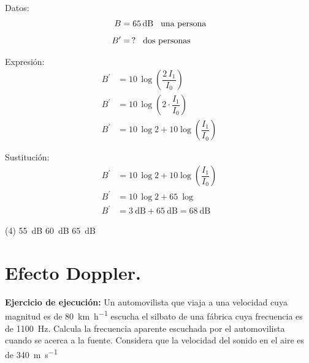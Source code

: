 \documentclass[12pt, letter]{exam}
\begin{document}
\begin{questions}
    \begin{minipage}[t]{0.35\linewidth}
    Datos: 
    \begin{align*}
    B &= \SI{65}{\dB} \hspace{0.3cm} \text{una persona} \\[0.5em]
    B^{\prime} &= \, ? \hspace{0.3cm} \text{dos personas}
    \end{align*}
    \end{minipage}
    \hspace{1cm}
    \begin{minipage}[t]{0.4\linewidth}
    Expresión:
    \begin{align*}
    B^{\prime} &= 10 \, \log \left( \dfrac{2 \, I_{1}}{I_{0}} \right) \\[0.4em]
    B^{\prime} &= 10 \, \log \left( 2 \cdot \dfrac{I_{1}}{I_{0}} \right) \\[0.4em]
    B^{\prime} &= 10 \, \log 2 + 10 \log \left( \dfrac{I_{1}}{I_{0}} \right)
    \end{align*}
    \end{minipage}

    Sustitución:
    \begin{align*}
    B^{\prime} &= 10 \, \log 2 + 10 \log \left( \dfrac{I_{1}}{I_{0}} \right) \\[0.4em]
    B^{\prime} &= 10 \, \log 2 + \SI{65}{\log} \\[0.4em]
    B^{\prime} &= \SI{3}{\dB} + \SI{65}{\dB} = \SI{68}{\dB}
    \end{align*}
    \begin{tasks}(4)
        \task \SI{55}{\dB}
        \task \SI{60}{\dB}
        \task \SI{65}{\dB}
        \task {}
    \end{tasks}

    \setcounter{section}{3}

    \section{Efecto Doppler.}

    \setcounter{question}{10} \question \textbf{Ejercicio de ejecución: } Un automovilista que viaja a una velocidad cuya magnitud es de \SI{80}{\kilo\meter\per\hour} escucha el silbato de una fábrica cuya frecuencia es de \SI{1100}{\hertz}. Calcula la frecuencia aparente escuchada por el automovilista cuando se acerca a la fuente. Considera que la velocidad del sonido en el aire es de \SI{340}{\meter\per\second}


\end{questions}
\end{document}
